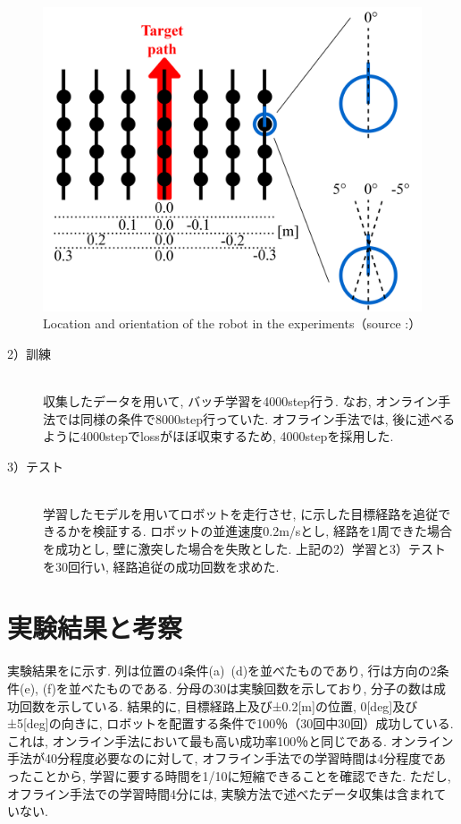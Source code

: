 \begin{figure}[h]
  \centering
  \includegraphics[keepaspectratio, scale=0.6]{images/collect2.png}
  \caption{Location and orientation of the robot in the experiments（source :\cite{offline}）}
  \label{Fig:old-method}
  \end{figure}

\begin{description}
  \item[2）訓練]\mbox{}\\ \hspace*{3mm}収集したデータを用いて, バッチ学習を4000step行う. なお, オンライン手法では同様の条件で8000step行っていた. オフライン手法では, 後に述べるように4000stepでlossがほぼ収束するため, 4000stepを採用した.
\end{description}

\begin{description}
  \item[3）テスト]\mbox{}\\ \hspace*{3mm}学習したモデルを用いてロボットを走行させ, に示した目標経路を追従できるかを検証する. ロボットの並進速度0.2m/sとし, 経路を1周できた場合を成功とし, 壁に激突した場合を失敗とした. 上記の2）学習と3）テストを30回行い, 経路追従の成功回数を求めた. 
\end{description}

\section{実験結果と考察}
実験結果をに示す. 列は位置の4条件(a)~(d)を並べたものであり, 行は方向の2条件(e), (f)を並べたものである. 分母の30は実験回数を示しており, 分子の数は成功回数を示している. 結果的に, 目標経路上及び±0.2[m]の位置, 0[deg]及び±5[deg]の向きに, ロボットを配置する条件で100％（30回中30回）成功している. これは, オンライン手法において最も高い成功率100％\cite{okada-si2021}と同じである. オンライン手法が40分程度必要なのに対して, オフライン手法での学習時間は4分程度であったことから, 学習に要する時間を1/10に短縮できることを確認できた. ただし, オフライン手法での学習時間4分には, 実験方法で述べたデータ収集は含まれていない. 

